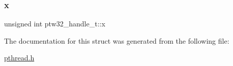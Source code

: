 \mbox{\label{structptw32__handle__t_a156e4e4394eb30aa3f977794496db34b}} 
\subsubsection{\texorpdfstring{x}{x}}
{\footnotesize\ttfamily unsigned int ptw32\+\_\+handle\+\_\+t\+::x}



The documentation for this struct was generated from the following file\+:\begin{DoxyCompactItemize}
\item 
\mbox{\hyperlink{pthread_8h}{pthread.\+h}}\end{DoxyCompactItemize}
